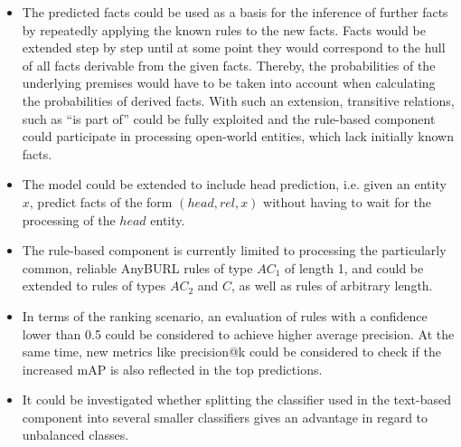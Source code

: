 \begin{itemize}
    \item The predicted facts could be used as a basis for the inference of further facts by repeatedly applying the known rules to the new facts. Facts would be extended step by step until at some point they would correspond to the hull of all facts derivable from the given facts. Thereby, the probabilities of the underlying premises would have to be taken into account when calculating the probabilities of derived facts. With such an extension, transitive relations, such as ``is part of'' could be fully exploited and the rule-based component could participate in processing open-world entities, which lack initially known facts.

    \item The model could be extended to include head prediction, i.e. given an entity $x$, predict facts of the form $(head, rel, x)$ without having to wait for the processing of the $head$ entity.

    \item The rule-based component is currently limited to processing the particularly common, reliable AnyBURL rules of type $AC_1$ of length 1, and could be extended to rules of types $AC_2$ and $C$, as well as rules of arbitrary length.

    \item In terms of the ranking scenario, an evaluation of rules with a confidence lower than 0.5 could be considered to achieve higher average precision. At the same time, new metrics like precision@k could be considered to check if the increased mAP is also reflected in the top predictions.

    \item It could be investigated whether splitting the classifier used in the text-based component into several smaller classifiers gives an advantage in regard to unbalanced classes.
\end{itemize}
